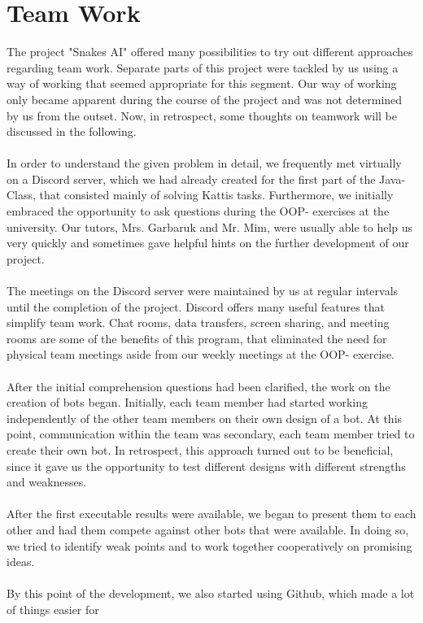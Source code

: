 \documentclass[a4paper,12pt]{article}
\begin{document}
\section{Team Work}
The project "Snakes AI" offered many possibilities to try out different approaches regarding team
work. Separate parts of this project were tackled by us using a way of working that seemed
appropriate for this segment. Our way of working only became apparent during the course of the
project and was not determined by us from the outset. Now, in retrospect, some thoughts on
teamwork will be discussed in the following.\\
\\In order to understand the given problem in detail, we frequently met virtually on a Discord server,
which we had already created for the first part of the Java-Class, that consisted mainly of solving
Kattis tasks. Furthermore, we initially embraced the opportunity to ask questions during the OOP-
exercises at the university. Our tutors, Mrs. Garbaruk and Mr. Mim, were usually able to help us
very quickly and sometimes gave helpful hints on the further development of our project.\\
\\The meetings on the Discord server were maintained by us at regular intervals until the completion
of the project. Discord offers many useful features that simplify team work. Chat rooms, data
transfers, screen sharing, and meeting rooms are some of the benefits of this program, that
eliminated the need for physical team meetings aside from our weekly meetings at the OOP-
exercise.\\
\\After the initial comprehension questions had been clarified, the work on the creation of bots began.
Initially, each team member had started working independently of the other team members on their
own design of a bot. At this point, communication within the team was secondary, each team
member tried to create their own bot. In retrospect, this approach turned out to be beneficial, since it
gave us the opportunity to test different designs with different strengths and weaknesses.\\
\\After the first executable results were available, we began to present them to each other and had
them compete against other bots that were available. In doing so, we tried to identify weak points
and to work together cooperatively on promising ideas.\\
\\By this point of the development, we also started using Github, which made a lot of things easier for
\end{document}
